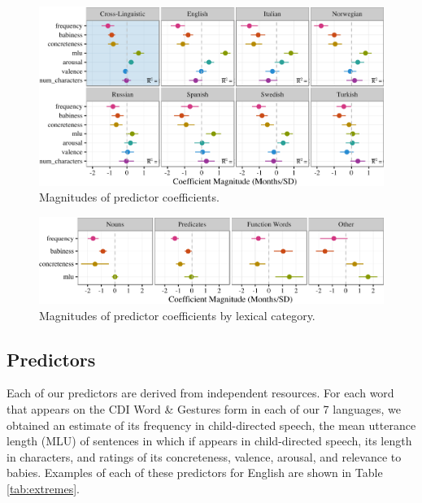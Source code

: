 \documentclass[10pt, letterpaper]{article}
\newenvironment{CodeChunk}{}{}
\begin{document}
\begin{CodeChunk}
\begin{figure}[tb]

{\centering \includegraphics{figs/coefs-1} 

}

\caption[Magnitudes of predictor coefficients]{Magnitudes of predictor coefficients.}\label{fig:coefs}
\end{figure}
\end{CodeChunk}

\begin{CodeChunk}
\begin{figure}[tb]

{\centering \includegraphics{figs/coefs_lexcat-1} 

}

\caption[Magnitudes of predictor coefficients by lexical category]{Magnitudes of predictor coefficients by lexical category.}\label{fig:coefs_lexcat}
\end{figure}
\end{CodeChunk}

\subsection{Predictors}\label{predictors}

Each of our predictors are derived from independent resources. For each
word that appears on the CDI Word \& Gestures form in each of our 7
languages, we obtained an estimate of its frequency in child-directed
speech, the mean utterance length (MLU) of sentences in which if appears
in child-directed speech, its length in characters, and ratings of its
concreteness, valence, arousal, and relevance to babies. Examples of
each of these predictors for English are shown in Table
\ref{tab:extremes}.
\end{document}

